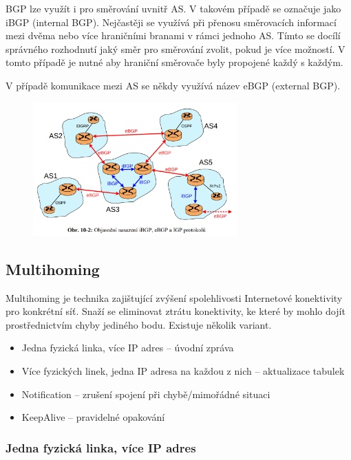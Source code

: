 BGP lze využít i pro směrování uvnitř AS.
V takovém případě se označuje jako iBGP (internal BGP).
Nejčastěji se využívá při přenosu směrovacích informací mezi dvěma nebo více hraničními branami v rámci jednoho AS.
Tímto se docílí správného rozhodnutí jaký směr pro směrování zvolit, pokud je více možností.
V tomto případě je nutné aby hraniční směrovače byly propojené každý s každým.

V případě komunikace mezi AS se někdy využívá název eBGP (external BGP).

\begin{figure}[!h]
    \centering
    \includegraphics[width=0.7\textwidth]{obrazky/090.png}
\end{figure}


\subsection{Multihoming}

Multihoming je technika zajištující zvýšení spolehlivosti Internetové konektivity pro konkrétní síť.
Snaží se eliminovat ztrátu konektivity, ke které by mohlo dojít prostřednictvím chyby jediného bodu.
Existuje několik variant.

\begin{itemize}[noitemsep]
        \item Jedna fyzická linka, více IP adres -- úvodní zpráva
        \item Více fyzických linek, jedna IP adresa na každou z nich -- aktualizace tabulek
        \item Notification -- zrušení spojení při chybě/mimořádné situaci
        \item KeepAlive -- pravidelné opakování
\end{itemize}

\subsubsection{Jedna fyzická linka, více IP adres}

